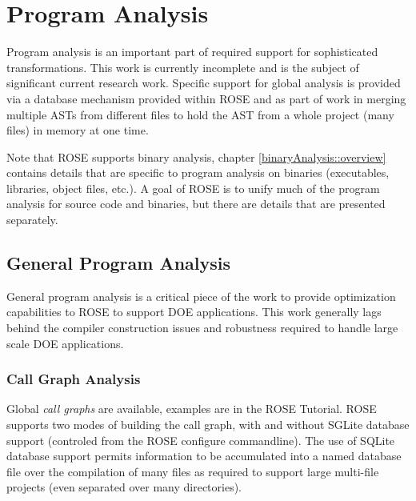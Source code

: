 \chapter{Program Analysis}

\label{ProgramAnalysis}


Program analysis is an important part of required support for sophisticated 
transformations. This work is currently incomplete and is
the subject of significant current research work.  Specific support for global analysis 
is provided via a database mechanism provided within ROSE and as part of work
in merging multiple ASTs from different files to hold the AST from a whole project
(many files) in memory at one time.

Note that ROSE supports binary analysis, chapter \ref{binaryAnalysis::overview}
contains details that are specific to program analysis on binaries (executables,
libraries, object files, etc.).
A goal of ROSE is to unify much of the program analysis for source code and binaries, 
but there are details that are presented separately.

\section{General Program Analysis}

   General program analysis is a critical piece of the work to
provide optimization capabilities to ROSE to support DOE applications.
This work generally lags behind the compiler construction issues
and robustness required to handle large scale DOE applications.

\subsection{Call Graph Analysis}

   Global {\it call graphs} are available, examples are in the ROSE Tutorial.
ROSE supports two modes of building the call graph, with and without SGLite 
database support (controled from the ROSE configure commandline). The use of SQLite
database support permits information to be accumulated into a named database file
over the compilation of many files as required to support large multi-file projects
(even separated over many directories).

